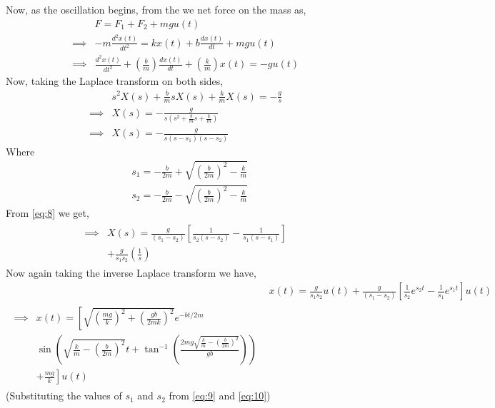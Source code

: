 \documentclass[journal,12pt,twocolumn]{IEEEtran}
\theoremstyle{remark}
\begin{document}
\begin{enumerate}
Now, as the oscillation begins, from the  we net force on the mass as,
\begin{align}
    &F=F_{1}+F_{2}+mgu(t) \label{eq:3}\\
    \implies &-m\frac{d^2x(t)}{dt^2}=kx(t)+b\frac{dx(t)}{dt}+mgu(t) \label{eq:4}\\
    \implies &\frac{d^2x(t)}{dt^2}+\left(\frac{b}{m}\right)\frac{dx(t)}{dt}+\left(\frac{k}{m}\right)x(t)=-gu(t) \label{eq:5}
\end{align}
Now, taking the Laplace transform on both sides,
\begin{align}
&s^2X(s)+\frac{b}{m}sX(s)+\frac{k}{m}X(s)=-\frac{g}{s} \label{eq:6}\\
\implies &X(s)=-\frac{g}{s\left(s^2+\frac{b}{m}s+\frac{k}{m}\right)} \label{eq:7}\\
\implies &X(s)=-\frac{g}{s(s-s_1)(s-s_2)} \label{eq:8}
\end{align}
Where
\begin{align}
&s_1=-\frac{b}{2m}+\sqrt{\left(\frac{b}{2m}\right)^2-\frac{k}{m}} \label{eq:9}\\
&s_2=-\frac{b}{2m}-\sqrt{\left(\frac{b}{2m}\right)^2-\frac{k}{m}} \label{eq:10}
\end{align}
From \eqref{eq:8} we get,
\begin{align}
\begin{split}
\implies &X(s)=\frac{g}{(s_1-s_2)}\left[\frac{1}{s_2(s-s_2)}-\frac{1}{s_1(s-s_1)}\right] \\
&+\frac{g}{s_1s_2}\left(\frac{1}{s}\right) \label{eq:11}
\end{split}
\end{align}
Now again taking the inverse Laplace transform we have,
\begin{align}
&x(t)=\frac{g}{s_1s_2}u(t)+\frac{g}{(s_1-s_2)}\left[\frac{1}{s_2}e^{s_2t}-\frac{1}{s_1}e^{s_1t}\right]u(t)\label{eq:12}\\
\begin{split}
\implies &x(t)=\left[\sqrt{\left(\frac{mg}{k}\right)^2+\left(\frac{gb}{2mk}\right)^2}e^{-bt/2m}\right. \\
&\left.\sin{\left(\sqrt{\frac{k}{m}-\left(\frac{b}{2m}\right)^2}t+\tan^{-1}\left(\frac{2mg\sqrt{\frac{k}{m}-\left(\frac{b}{2m}\right)^2}}{gb}\right)\right)}\right. \\
&\left.+\frac{mg}{k}\right]u(t) \label{eq:13}
\end{split}
\end{align}
(Substituting the values of $s_1$ and $s_2$ from \eqref{eq:9} and \eqref{eq:10}) \\

\end{enumerate}
\end{document}
